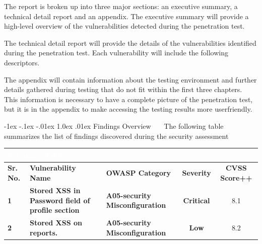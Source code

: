 \documentclass{article}
\makeatletter
\renewcommand{\section}{\@startsection{section}{1}{\z@}%
            {-1ex \@plus -.1ex \@minus -.01ex}%
            {1.0ex \@plus  .01ex}%
            {\normalfont\large\bfseries\color{sectioncolor}}}
\makeatother
\begin{document}
            \large The report is broken up into three major sections: an executive summary, a technical detail report and an appendix. The executive summary will provide a high-level overview of the vulnerabilities detected
            during the penetration test.

            \large The technical detail report will provide the details of the vulnerabilities identified during the penetration test. Each vulnerability will include the following descriptors.
            
            \large The appendix will contain information about the testing environment and further details gathered during testing that do not fit within the first three chapters. 
            This information is necessary to have a complete picture of the penetration test, but it is in the appendix to make accessing the testing results more userfriendly.


            \newpage
            \section{\large Findings Overview}
            \ \  \ The following table summarizes the list of findings discovered during the security assessment
            \begin{center}
                \begin{longtable} {|p{3em}|p{15em}|p{6em}|c|c|}
                    \hline 
                    \multicolumn{5}{|p{40em}|}{\large \cellcolor{tablecol} \textcolor{white}{\textbf{Summary Table}}} \\
                    \hline
                    \normalsize \cellcolor{tableco2} \textbf{Sr. No.} & \normalsize \cellcolor{tableco2} \textbf{Vulnerability Name} & \normalsize \cellcolor{tableco2} \textbf{OWASP Category} & \normalsize \cellcolor{tableco2} \textbf{Severity} & \normalsize \cellcolor{tableco2} \textbf{CVSS Score++} \\    
                    \hline
                    
                    \normalsize \center \textbf{1} & \normalsize \textbf{Stored XSS in Password field of profile section	} & \normalsize \textbf{A05-security Misconfiguration} & \normalsize \textbf{\textcolor{critical}{Critical}} &  8.1 \\
                    \hline
                    

                    \normalsize \center \textbf{2} & \normalsize \textbf{Stored XSS on reports.} & \normalsize \textbf{A05-security Misconfiguration} & \normalsize \textbf{\textcolor{low}{Low}} &  8.2 \\
                    \hline
                     
                \end{longtable}   
            \end{center}
            
\end{document}

